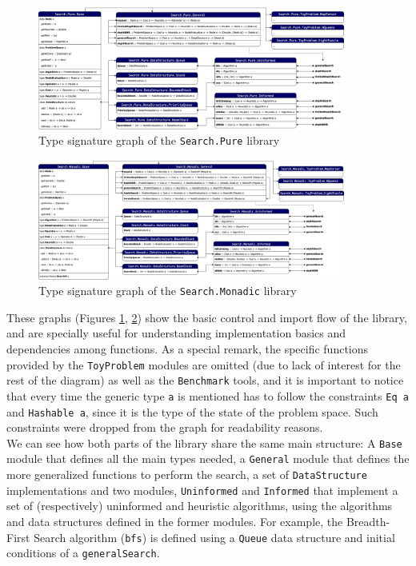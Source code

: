 \begin{figure}
  \centering
  \includegraphics[width=0.9\textwidth]{img/type-graph-pure.png}
  \vspace{1cm}
  \caption{Type signature graph of the \texttt{Search.Pure} library}
  \label{graph-pure}
\end{figure}

\begin{figure}
  \centering
  \includegraphics[width=0.9\textwidth]{img/type-graph-monadic.png}
  \vspace{1cm}
  \caption{Type signature graph of the \texttt{Search.Monadic} library}
  \label{graph-monadic}
\end{figure}

These graphs (Figures \ref{graph-pure}, \ref{graph-monadic}) show the basic
control and import flow of the library, and are specially useful for
understanding implementation basics and dependencies among functions. As a
special remark, the specific functions provided by the \texttt{ToyProblem}
modules are omitted (due to lack of interest for the rest of the diagram) as
well as the \texttt{Benchmark} tools, and it is important to notice that every
time the generic type \texttt{a} is mentioned has to follow the constraints
\texttt{Eq a} and \texttt{Hashable a}, since it is the type of the state of the
problem space. Such constraints were dropped from the graph for readability
reasons.\\

We can see how both parts of the library share the same main structure: A
\texttt{Base} module that defines all the main types needed, a \texttt{General}
module that defines the more generalized functions to perform the search, a set
of \texttt{DataStructure} implementations and two modules, \texttt{Uninformed}
and \texttt{Informed} that implement a set of (respectively) uninformed and
heuristic algorithms, using the algorithms and data structures defined in the
former modules. For example, the Breadth-First Search algorithm (\texttt{bfs})
is defined using a \texttt{Queue} data structure and initial conditions of a
\texttt{generalSearch}.\\

